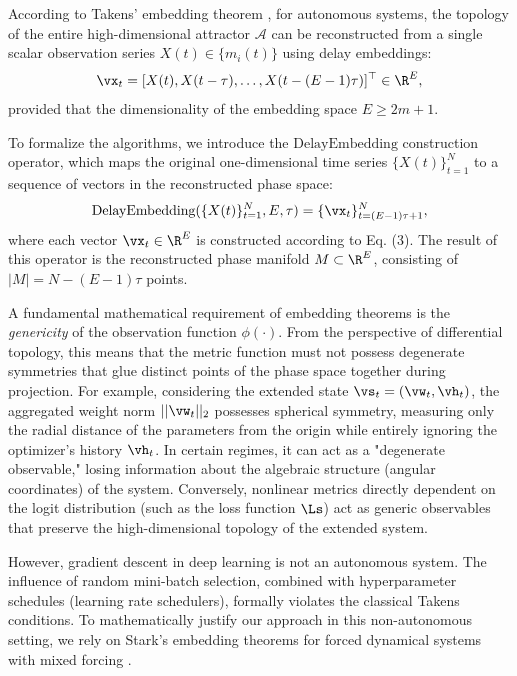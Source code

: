 \documentclass{article}
\begin{document}
According to Takens' embedding theorem \citep{takens1981detecting}, for autonomous systems, the topology of the entire high-dimensional attractor $\mathcal{A}$ can be reconstructed from a single scalar observation series $X(t) \in \{m_i(t)\}$ using delay embeddings:
\begin{equation}
    \vx_t =[X(t), X(t-\tau), \dots, X(t-(E-1)\tau)]^\top \in \R^E,
\end{equation}
provided that the dimensionality of the embedding space $E \ge 2m + 1$.

To formalize the algorithms, we introduce the $\text{DelayEmbedding}$ construction operator, which maps the original one-dimensional time series $\{X(t)\}_{t=1}^N$ to a sequence of vectors in the reconstructed phase space:
\begin{equation}
    \text{DelayEmbedding}(\{X(t)\}_{t=1}^N, E, \tau) = \{ \vx_t \}_{t=(E-1)\tau + 1}^{N},
\end{equation}
where each vector $\vx_t \in \R^E$ is constructed according to Eq. (3). The result of this operator is the reconstructed phase manifold $M \subset \R^E$, consisting of $|M| = N - (E-1)\tau$ points.

A fundamental mathematical requirement of embedding theorems is the \textit{genericity} of the observation function $\phi(\cdot)$. From the perspective of differential topology, this means that the metric function must not possess degenerate symmetries that glue distinct points of the phase space together during projection. For example, considering the extended state $\vs_t = (\vw_t, \vh_t)$, the aggregated weight norm $||\vw_t||_2$ possesses spherical symmetry, measuring only the radial distance of the parameters from the origin while entirely ignoring the optimizer's history $\vh_t$. In certain regimes, it can act as a "degenerate observable," losing information about the algebraic structure (angular coordinates) of the system. Conversely, nonlinear metrics directly dependent on the logit distribution (such as the loss function $\Ls$) act as generic observables that preserve the high-dimensional topology of the extended system.

However, gradient descent in deep learning is not an autonomous system. The influence of random mini-batch selection, combined with hyperparameter schedules (learning rate schedulers), formally violates the classical Takens conditions. To mathematically justify our approach in this non-autonomous setting, we rely on Stark's embedding theorems for forced dynamical systems with mixed forcing \citep{stark1999delay, stark2003delay}.
\end{document}
